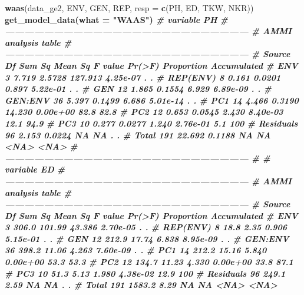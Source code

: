 \documentclass[
]{book}
\newenvironment{Shaded}{\begin{snugshade}}{\end{snugshade}}
\newcommand{\CommentTok}[1]{\textcolor[rgb]{0.56,0.35,0.01}{\textit{#1}}}
\newcommand{\DataTypeTok}[1]{\textcolor[rgb]{0.13,0.29,0.53}{#1}}
\newcommand{\KeywordTok}[1]{\textcolor[rgb]{0.13,0.29,0.53}{\textbf{#1}}}
\newcommand{\NormalTok}[1]{#1}
\newcommand{\OperatorTok}[1]{\textcolor[rgb]{0.81,0.36,0.00}{\textbf{#1}}}
\newcommand{\StringTok}[1]{\textcolor[rgb]{0.31,0.60,0.02}{#1}}
\begin{document}
\begin{Shaded}
\begin{Highlighting}[]
\KeywordTok{waas}\NormalTok{(data_ge2, ENV, GEN, REP,}
     \DataTypeTok{resp =} \KeywordTok{c}\NormalTok{(PH, ED, TKW, NKR)) }\OperatorTok{%
\StringTok{ }\KeywordTok{get_model_data}\NormalTok{(}\DataTypeTok{what =} \StringTok{"WAAS"}\NormalTok{)}
\CommentTok{# variable PH }
\CommentTok{# ---------------------------------------------------------------------------}
\CommentTok{# AMMI analysis table}
\CommentTok{# ---------------------------------------------------------------------------}
\CommentTok{#     Source  Df Sum Sq Mean Sq F value   Pr(>F) Proportion Accumulated}
\CommentTok{#        ENV   3  7.719  2.5728 127.913 4.25e-07          .           .}
\CommentTok{#   REP(ENV)   8  0.161  0.0201   0.897 5.22e-01          .           .}
\CommentTok{#        GEN  12  1.865  0.1554   6.929 6.89e-09          .           .}
\CommentTok{#    GEN:ENV  36  5.397  0.1499   6.686 5.01e-14          .           .}
\CommentTok{#        PC1  14  4.466  0.3190  14.230 0.00e+00       82.8        82.8}
\CommentTok{#        PC2  12  0.653  0.0545   2.430 8.40e-03       12.1        94.9}
\CommentTok{#        PC3  10  0.277  0.0277   1.240 2.76e-01        5.1         100}
\CommentTok{#  Residuals  96  2.153  0.0224      NA       NA          .           .}
\CommentTok{#      Total 191 22.692  0.1188      NA       NA       <NA>        <NA>}
\CommentTok{# ---------------------------------------------------------------------------}
\CommentTok{# }
\CommentTok{# variable ED }
\CommentTok{# ---------------------------------------------------------------------------}
\CommentTok{# AMMI analysis table}
\CommentTok{# ---------------------------------------------------------------------------}
\CommentTok{#     Source  Df Sum Sq Mean Sq F value   Pr(>F) Proportion Accumulated}
\CommentTok{#        ENV   3  306.0  101.99  43.386 2.70e-05          .           .}
\CommentTok{#   REP(ENV)   8   18.8    2.35   0.906 5.15e-01          .           .}
\CommentTok{#        GEN  12  212.9   17.74   6.838 8.95e-09          .           .}
\CommentTok{#    GEN:ENV  36  398.2   11.06   4.263 7.60e-09          .           .}
\CommentTok{#        PC1  14  212.2   15.16   5.840 0.00e+00       53.3        53.3}
\CommentTok{#        PC2  12  134.7   11.23   4.330 0.00e+00       33.8        87.1}
\CommentTok{#        PC3  10   51.3    5.13   1.980 4.38e-02       12.9         100}
\CommentTok{#  Residuals  96  249.1    2.59      NA       NA          .           .}
\CommentTok{#      Total 191 1583.2    8.29      NA       NA       <NA>        <NA>}
}
\end{Highlighting}
\end{Shaded}
\end{document}
